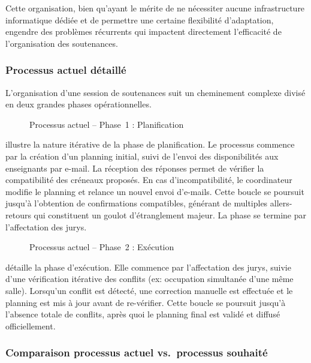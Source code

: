 Cette organisation, bien qu'ayant le mérite de ne nécessiter aucune infrastructure informatique dédiée et de permettre une certaine flexibilité d'adaptation, engendre des problèmes récurrents qui impactent directement l'efficacité de l'organisation des soutenances.

\subsubsection{Processus actuel détaillé}
\label{ch2:processus_actuel}

L'organisation d'une session de soutenances suit un cheminement complexe divisé en deux grandes phases opérationnelles.

\begin{figure}[H]
    \centering
    \caption{Processus actuel -- Phase~1 : Planification}
    \label{fig:processus_actuel_phase_un}
\end{figure}

 illustre la nature itérative de la phase de planification. Le processus commence par la création d'un planning initial, suivi de l'envoi des disponibilités aux enseignants par e-mail. La réception des réponses permet de vérifier la compatibilité des créneaux proposés. En cas d'incompatibilité, le coordinateur modifie le planning et relance un nouvel envoi d'e-mails. Cette boucle se poursuit jusqu'à l'obtention de confirmations compatibles, générant de multiples allers-retours qui constituent un goulot d'étranglement majeur. La phase se termine par l'affectation des jurys.

\begin{figure}[H]
    \centering
    \caption{Processus actuel -- Phase~2 : Exécution}
    \label{fig:processus_actuel_phase_deux}
\end{figure}

 détaille la phase d'exécution. Elle commence par l'affectation des jurys, suivie d'une vérification itérative des conflits (ex: occupation simultanée d'une même salle). Lorsqu'un conflit est détecté, une correction manuelle est effectuée et le planning est mis à jour avant de re-vérifier. Cette boucle se poursuit jusqu'à l'absence totale de conflits, après quoi le planning final est validé et diffusé officiellement.


\subsubsection{Comparaison processus actuel vs.\ processus souhaité}
\label{ch2:comparaison_processus}

